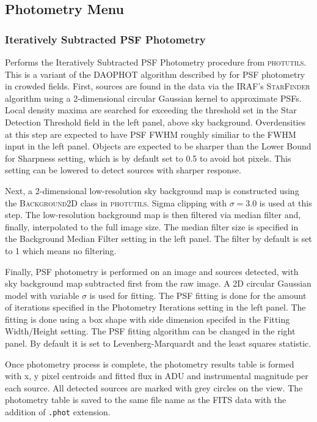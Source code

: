 \documentclass{article}
\begin{document}
\subsection{Photometry Menu}
\subsubsection{Iteratively Subtracted PSF Photometry}
Performs the Iteratively Subtracted PSF Photometry procedure from \textsc{photutils}. This is a variant of the \textsc{DAOPHOT} algorithm described by \citet{1987PASP...99..191S} for PSF photometry in crowded fields. First, sources are found in the data via the IRAF's \textsc{StarFinder} algorithm using a 2-dimensional circular Gaussian kernel to approximate PSFs. Local density maxima are searched for exceeding 	the threshold set in the Star Detection Threshold field in the left panel, above sky background. Overdensities at this step are expected to have PSF FWHM roughly similiar to the FWHM input in the left panel. Objects are expected to be sharper than the Lower Bound for Sharpness setting, which is by default set to 0.5 to avoid hot pixels. This setting can be lowered to detect sources with sharper response.

Next, a 2-dimensional low-resolution sky background map is constructed using the \textsc{Background2D} class in \textsc{photutils}. Sigma clipping with $\sigma = 3.0$ is used at this step. The low-resolution background map is then filtered via median filter and, finally, interpolated to the full image size. The median filter size is specified in the Background Median Filter setting in the left panel. The filter by default is set to 1 which means no filtering. 

Finally, PSF photometry is performed on an image and sources detected, with sky background map subtracted first from the raw image. A 2D circular Gaussian model with variable $\sigma$ is used for fitting. The PSF fitting is done for the amount of iterations specified in the Photometry Iterations setting in the left panel. The fitting is done using a box shape with side dimension specifed in the Fitting Width/Height setting. The PSF fitting algorithm can be changed in the right panel. By default it is set to Levenberg-Marquardt and the least squares statistic.

Once photometry process is complete, the photometry results table is formed with x, y pixel centroids and fitted flux in ADU and instrumental magnitude per each source. All detected sources are marked with grey circles on the view. The photometry table is saved to the same file name as the FITS data with the addition of \texttt{.phot} extension. 
\end{document}
